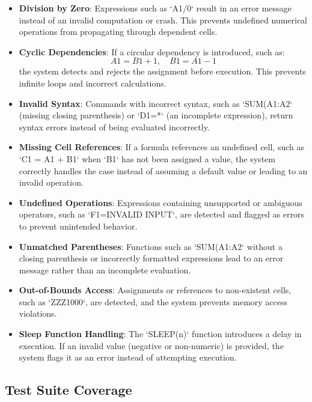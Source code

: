 \documentclass[a4paper,12pt]{article}
\begin{document}
\begin{itemize}
    \item \textbf{Division by Zero}: Expressions such as `A1/0` result in an error message instead of an invalid computation or crash. This prevents undefined numerical operations from propagating through dependent cells.
    
    \item \textbf{Cyclic Dependencies}: If a circular dependency is introduced, such as:
    \[
    A1 = B1 + 1, \quad B1 = A1 - 1
    \]
    the system detects and rejects the assignment before execution. This prevents infinite loops and incorrect calculations.
    
    \item \textbf{Invalid Syntax}: Commands with incorrect syntax, such as `SUM(A1:A2` (missing closing parenthesis) or `D1=*` (an incomplete expression), return syntax errors instead of being evaluated incorrectly.
    
    \item \textbf{Missing Cell References}: If a formula references an undefined cell, such as `C1 = A1 + B1` when `B1` has not been assigned a value, the system correctly handles the case instead of assuming a default value or leading to an invalid operation.
    
 \item \textbf{Undefined Operations}: Expressions containing unsupported or ambiguous operators, such as `F1=INVALID INPUT`, are detected and flagged as errors to prevent unintended behavior.

    \item \textbf{Unmatched Parentheses}: Functions such as `SUM(A1:A2` without a closing parenthesis or incorrectly formatted expressions lead to an error message rather than an incomplete evaluation.
    
    \item \textbf{Out-of-Bounds Access}: Assignments or references to non-existent cells, such as `ZZZ1000`, are detected, and the system prevents memory access violations.
    
    \item \textbf{Sleep Function Handling}: The `SLEEP(n)` function introduces a delay in execution. If an invalid value (negative or non-numeric) is provided, the system flags it as an error instead of attempting execution.
\end{itemize}

\subsection{Test Suite Coverage}
\end{document}
